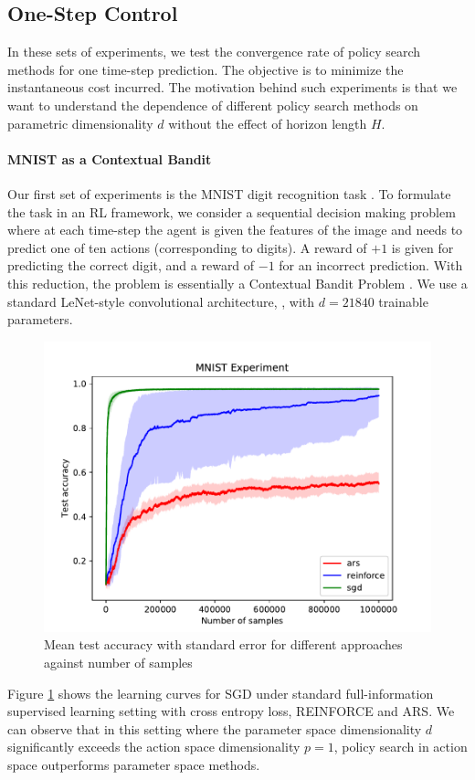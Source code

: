 \subsection{One-Step Control}
\label{sec:one-step-control}

In these sets of experiments, we test the convergence rate of policy
search methods for one time-step prediction. The objective is to minimize the instantaneous cost incurred. The motivation behind such experiments is that we want to
understand the dependence of different policy search methods on
parametric dimensionality $d$ without the effect of horizon length
$H$.

%
%


\paragraph{MNIST as a Contextual Bandit} Our first set of experiments is the MNIST digit recognition task 
\citep{lecun1998gradient}. To formulate the task in an RL framework, we
consider a sequential decision making problem where at each time-step
the agent is given the features of the image and needs to predict one
of ten actions (corresponding to digits). A reward of $+1$
is given for predicting the correct digit, and a reward of $-1$ for
an incorrect prediction. With this reduction, the problem is essentially a Contextual Bandit Problem \citep{agarwal2014taming}. We use a standard LeNet-style convolutional architecture,
\citep{lecun1998gradient}, with $d=21840$ trainable parameters.
\begin{figure}[t]
  \centering
  \includegraphics[width=0.5\linewidth]{figures/aistats19/mnist.pdf}
  \caption{Mean test accuracy with standard error for different
    approaches against number of samples}
  \label{fig:mnist}
\end{figure}
Figure \ref{fig:mnist} shows the learning curves for SGD under standard full-information
supervised learning setting with cross entropy loss, REINFORCE and ARS. 
%
%
%
We can
observe that in this setting where the parameter space dimensionality
$d$ significantly exceeds the action space dimensionality $p = 1$, policy search in
action space outperforms parameter space methods.

